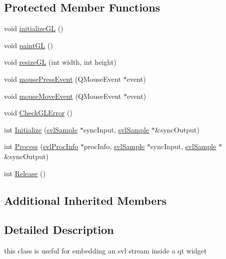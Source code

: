 \subsection*{Protected Member Functions}
\begin{DoxyCompactItemize}
\item 
void \hyperlink{classsvl_filter_image_qt_widget_a72fb0e437786ef03389b4d51d0b594ff}{initialize\-G\-L} ()
\item 
void \hyperlink{classsvl_filter_image_qt_widget_a6ec1f6524b7f549190001a7190cc1e48}{paint\-G\-L} ()
\item 
void \hyperlink{classsvl_filter_image_qt_widget_ad8855463e92eb40848421516076f43bb}{resize\-G\-L} (int width, int height)
\item 
void \hyperlink{classsvl_filter_image_qt_widget_ada707cf4e2657018ad82b3fb2dcee4e5}{mouse\-Press\-Event} (Q\-Mouse\-Event $\ast$event)
\item 
void \hyperlink{classsvl_filter_image_qt_widget_a698ba1d57dcc70498649a703cf8b6d88}{mouse\-Move\-Event} (Q\-Mouse\-Event $\ast$event)
\item 
void \hyperlink{classsvl_filter_image_qt_widget_aa32c1561df8e08a373b056cb31ab159a}{Check\-G\-L\-Error} ()
\item 
int \hyperlink{classsvl_filter_image_qt_widget_a21ae09a4916c06c8093dc80e315695a9}{Initialize} (\hyperlink{classsvl_sample}{svl\-Sample} $\ast$sync\-Input, \hyperlink{classsvl_sample}{svl\-Sample} $\ast$\&sync\-Output)
\item 
int \hyperlink{classsvl_filter_image_qt_widget_a5011dab85054e0a838475aa9dd4cdcaf}{Process} (\hyperlink{structsvl_proc_info}{svl\-Proc\-Info} $\ast$proc\-Info, \hyperlink{classsvl_sample}{svl\-Sample} $\ast$sync\-Input, \hyperlink{classsvl_sample}{svl\-Sample} $\ast$\&sync\-Output)
\item 
int \hyperlink{classsvl_filter_image_qt_widget_a301e6fa770ba91df8eb817085a6f8751}{Release} ()
\end{DoxyCompactItemize}
\subsection*{Additional Inherited Members}


\subsection{Detailed Description}
this class is useful for embedding an svl stream inside a qt widget 

